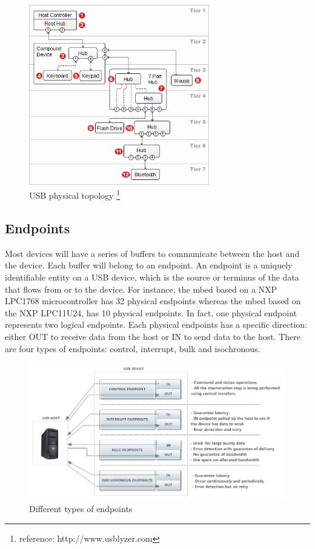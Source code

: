 \documentclass[pdftex,12pt,a4paper]{report}
\begin{document}
\begin{figure}[h!]
  \begin{minipage}{\textwidth}
		\centering
		\includegraphics[width=0.7\textwidth]{./usb_topology.png}
		\caption{USB physical topology \footnote{reference: http://www.usblyzer.com}}
		\label{USB physical topology}
  \end{minipage}
\end{figure}

\subsection{Endpoints}
Most devices will have a series of buffers to communicate between the host and the device. Each buffer will belong to an endpoint. An endpoint is a uniquely identifiable entity on a USB device, which is the source or terminus of the data that flows from or to the device. For instance, the mbed based on a NXP LPC1768 microcontroller has 32 physical endpoints whereas the mbed based on the NXP LPC11U24, has 10 physical endpoints. In fact, one physical endpoint represents two logical endpoints. Each physical endpoints has a specific direction: either OUT to receive data from the host or IN to send data to the host. There are four types of endpoints: control, interrupt, bulk and isochronous.
	
\begin{figure}[h!]
		\centering
		\includegraphics[width=1.0\textwidth]{./endpoint.png}
		\caption{Different types of endpoints}
		\label{Different types of endpoints}
\end{figure}
\end{document}
